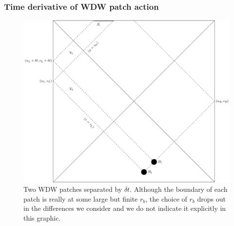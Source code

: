 \documentclass[10pt]{beamer}
\begin{document}
\begin{frame}
\frametitle{Time derivative of WDW patch action}

\begin{figure}
    \begin{center}
    
        \includegraphics[scale=0.5]{WDW.pdf}    
    
    \end{center}
    \caption{Two WDW patches separated by $\delta t$.  Although the boundary of each patch is really at some large but finite $r_b$, the choice of $r_b$ drops out in the differences we consider and we do not indicate it explicitly in this graphic.}
    \label{fig:WDW}
\end{figure}

\end{frame}


\end{document}
